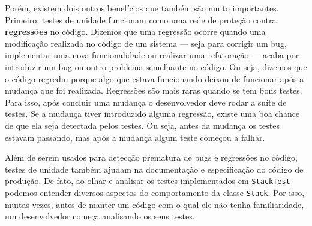 \documentclass[
  11pt,
  twoside]{book}
\newcommand{\passthrough}[1]{#1}
\begin{document}
 Porém, existem dois outros
benefícios que também são muito importantes. Primeiro, testes de unidade
funcionam como uma rede de proteção contra \textbf{regressões} no
código. Dizemos que uma regressão ocorre quando uma modificação
realizada no código de um sistema --- seja para corrigir um bug,
implementar uma nova funcionalidade ou realizar uma refatoração ---
acaba por introduzir um bug ou outro problema semelhante no código. Ou
seja, dizemos que o código regrediu porque algo que estava funcionando
deixou de funcionar após a mudança que foi realizada. Regressões são
mais raras quando se tem bons testes. Para isso, após concluir uma
mudança o desenvolvedor deve rodar a suíte de testes. Se a mudança tiver
introduzido alguma regressão, existe uma boa chance de que ela seja
detectada pelos testes. Ou seja, antes da mudança os testes estavam
passando, mas após a mudança algum teste começou a falhar.

Além de serem usados para detecção prematura de bugs e regressões no
código, testes de unidade também ajudam na documentação e especificação
do código de produção. De fato, ao olhar e analisar os testes
implementados em \passthrough{\lstinline!StackTest!} podemos entender
diversos aspectos do comportamento da classe
\passthrough{\lstinline!Stack!}. Por isso, muitas vezes, antes de manter
um código com o qual ele não tenha familiaridade, um desenvolvedor
começa analisando os seus testes.

 
\end{document}
